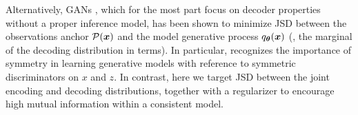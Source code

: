 Alternatively,  GANs \cite{NIPS2014_5423}, which for the most part focus on decoder properties without a proper inference model,
has been shown to minimize JSD between the observations anchor $\mathcal{P}({\boldsymbol{x}})$ and the model generative process $q_{{\boldsymbol \theta}}({\boldsymbol{x}})$ (\ie, the marginal of the decoding distribution in \MIM terms). 
In particular, \citep{DonahueKD16-BiGAN,Bang-BiGAN2018} recognizes the importance of symmetry in learning generative models with reference to symmetric discriminators on $x$ and $z$. In contrast, here we target JSD between the joint encoding and decoding distributions, together with a regularizer to encourage high mutual information within a consistent model.

    
    


